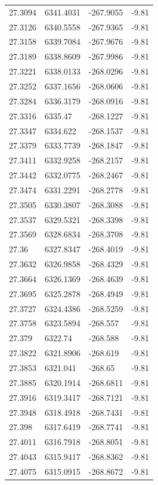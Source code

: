 \begin{table}[H]
\begin{tabular}{llll}
27.3094 & 6341.4031 & -267.9055 & -9.81 \\
27.3126 & 6340.5558 & -267.9365 & -9.81 \\
27.3158 & 6339.7084 & -267.9676 & -9.81 \\
27.3189 & 6338.8609 & -267.9986 & -9.81 \\
27.3221 & 6338.0133 & -268.0296 & -9.81 \\
27.3252 & 6337.1656 & -268.0606 & -9.81 \\
27.3284 & 6336.3179 & -268.0916 & -9.81 \\
27.3316 & 6335.47 & -268.1227 & -9.81 \\
27.3347 & 6334.622 & -268.1537 & -9.81 \\
27.3379 & 6333.7739 & -268.1847 & -9.81 \\
27.3411 & 6332.9258 & -268.2157 & -9.81 \\
27.3442 & 6332.0775 & -268.2467 & -9.81 \\
27.3474 & 6331.2291 & -268.2778 & -9.81 \\
27.3505 & 6330.3807 & -268.3088 & -9.81 \\
27.3537 & 6329.5321 & -268.3398 & -9.81 \\
27.3569 & 6328.6834 & -268.3708 & -9.81 \\
27.36 & 6327.8347 & -268.4019 & -9.81 \\
27.3632 & 6326.9858 & -268.4329 & -9.81 \\
27.3664 & 6326.1369 & -268.4639 & -9.81 \\
27.3695 & 6325.2878 & -268.4949 & -9.81 \\
27.3727 & 6324.4386 & -268.5259 & -9.81 \\
27.3758 & 6323.5894 & -268.557 & -9.81 \\
27.379 & 6322.74 & -268.588 & -9.81 \\
27.3822 & 6321.8906 & -268.619 & -9.81 \\
27.3853 & 6321.041 & -268.65 & -9.81 \\
27.3885 & 6320.1914 & -268.6811 & -9.81 \\
27.3916 & 6319.3417 & -268.7121 & -9.81 \\
27.3948 & 6318.4918 & -268.7431 & -9.81 \\
27.398 & 6317.6419 & -268.7741 & -9.81 \\
27.4011 & 6316.7918 & -268.8051 & -9.81 \\
27.4043 & 6315.9417 & -268.8362 & -9.81 \\
27.4075 & 6315.0915 & -268.8672 & -9.81 \\

\end{tabular}
\end{table}
